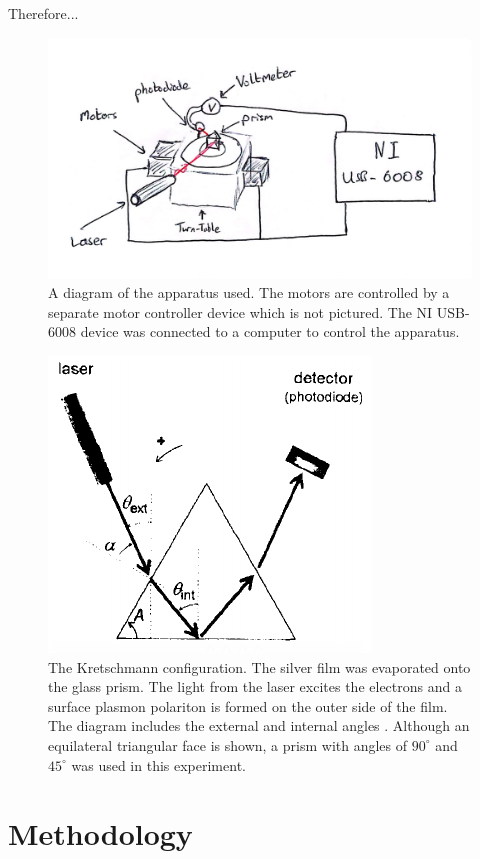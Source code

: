 \documentclass[%
reprint,
amsmath,amssymb,
aps,
]{revtex4-2}
\begin{document}
			Therefore...
		
			\begin{figure}
				\includegraphics[width=0.85\columnwidth]{SPdiagram.jpg}
				\caption{\label{fig:apparatus}A diagram of the apparatus used. The motors are controlled by a separate motor controller device which is not pictured. The NI USB-6008 device was connected to a computer to control the apparatus.}
			\end{figure}
			\begin{figure}
				\includegraphics[width=0.7\columnwidth]{anglesDiagram.png}
				\caption{\label{fig:angles}The Kretschmann configuration. The silver film was evaporated onto the glass prism. The light from the laser excites the electrons and a surface plasmon polariton is formed on the outer side of the film. The diagram includes the external and internal angles \cite{pluchery}. Although an equilateral triangular face is shown, a prism with angles of $90^\circ$ and $45^\circ$ was used in this experiment.}
			\end{figure}
	 
	\section{Methodology}
\end{document}
